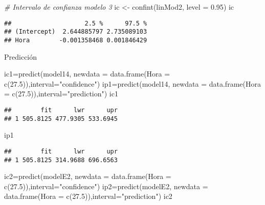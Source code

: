 \documentclass[
]{article}
\newenvironment{Shaded}{\begin{snugshade}}{\end{snugshade}}
\newcommand{\AttributeTok}[1]{\textcolor[rgb]{0.77,0.63,0.00}{#1}}
\newcommand{\CommentTok}[1]{\textcolor[rgb]{0.56,0.35,0.01}{\textit{#1}}}
\newcommand{\FloatTok}[1]{\textcolor[rgb]{0.00,0.00,0.81}{#1}}
\newcommand{\FunctionTok}[1]{\textcolor[rgb]{0.00,0.00,0.00}{#1}}
\newcommand{\NormalTok}[1]{#1}
\newcommand{\OtherTok}[1]{\textcolor[rgb]{0.56,0.35,0.01}{#1}}
\newcommand{\StringTok}[1]{\textcolor[rgb]{0.31,0.60,0.02}{#1}}
\begin{document}
\begin{Shaded}
\begin{Highlighting}[]
\CommentTok{\# Intervalo de confianza modelo 3}
\NormalTok{ic }\OtherTok{\textless{}{-}} \FunctionTok{confint}\NormalTok{(linMod2, }\AttributeTok{level =} \FloatTok{0.95}\NormalTok{)}
\NormalTok{ic}
\end{Highlighting}
\end{Shaded}

\begin{verbatim}
##                    2.5 %      97.5 %
## (Intercept)  2.644885797 2.735089103
## Hora        -0.001358468 0.001846429
\end{verbatim}

Predicción

\begin{Shaded}
\begin{Highlighting}[]
\NormalTok{ic1}\OtherTok{=}\FunctionTok{predict}\NormalTok{(model14, }\AttributeTok{newdata =} \FunctionTok{data.frame}\NormalTok{(}\AttributeTok{Hora =} \FunctionTok{c}\NormalTok{(}\FloatTok{27.5}\NormalTok{)),}\AttributeTok{interval=}\StringTok{"confidence"}\NormalTok{)}
\NormalTok{ip1}\OtherTok{=}\FunctionTok{predict}\NormalTok{(model14, }\AttributeTok{newdata =} \FunctionTok{data.frame}\NormalTok{(}\AttributeTok{Hora =} \FunctionTok{c}\NormalTok{(}\FloatTok{27.5}\NormalTok{)),}\AttributeTok{interval=}\StringTok{"prediction"}\NormalTok{)}
\NormalTok{ic1}
\end{Highlighting}
\end{Shaded}

\begin{verbatim}
##        fit      lwr      upr
## 1 505.8125 477.9305 533.6945
\end{verbatim}

\begin{Shaded}
\begin{Highlighting}[]
\NormalTok{ip1}
\end{Highlighting}
\end{Shaded}

\begin{verbatim}
##        fit      lwr      upr
## 1 505.8125 314.9688 696.6563
\end{verbatim}

\begin{Shaded}
\begin{Highlighting}[]
\NormalTok{ic2}\OtherTok{=}\FunctionTok{predict}\NormalTok{(modelE2, }\AttributeTok{newdata =} \FunctionTok{data.frame}\NormalTok{(}\AttributeTok{Hora =} \FunctionTok{c}\NormalTok{(}\FloatTok{27.5}\NormalTok{)),}\AttributeTok{interval=}\StringTok{"confidence"}\NormalTok{)}
\NormalTok{ip2}\OtherTok{=}\FunctionTok{predict}\NormalTok{(modelE2, }\AttributeTok{newdata =} \FunctionTok{data.frame}\NormalTok{(}\AttributeTok{Hora =} \FunctionTok{c}\NormalTok{(}\FloatTok{27.5}\NormalTok{)),}\AttributeTok{interval=}\StringTok{"prediction"}\NormalTok{)}
\NormalTok{ic2}
\end{Highlighting}
\end{Shaded}
\end{document}
